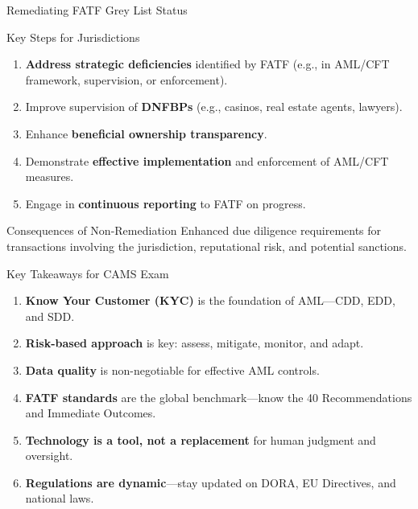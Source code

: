 \documentclass{beamer}
\begin{document}
	\begin{frame}{Remediating FATF Grey List Status}
		\begin{block}{Key Steps for Jurisdictions}
			\begin{enumerate}
				\item \textbf{Address strategic deficiencies} identified by FATF (e.g., in AML/CFT framework, supervision, or enforcement).
				\item Improve supervision of \textbf{DNFBPs} (e.g., casinos, real estate agents, lawyers).
				\item Enhance \textbf{beneficial ownership transparency}.
				\item Demonstrate \textbf{effective implementation} and enforcement of AML/CFT measures.
				\item Engage in \textbf{continuous reporting} to FATF on progress.
			\end{enumerate}
		\end{block}
		\begin{alertblock}{Consequences of Non-Remediation}
			Enhanced due diligence requirements for transactions involving the jurisdiction, reputational risk, and potential sanctions.
		\end{alertblock}
	\end{frame}
	
	\begin{frame}{Key Takeaways for CAMS Exam}
		\begin{enumerate}
			\item \textbf{Know Your Customer (KYC)} is the foundation of AML—CDD, EDD, and SDD.
			\item \textbf{Risk-based approach} is key: assess, mitigate, monitor, and adapt.
			\item \textbf{Data quality} is non-negotiable for effective AML controls.
			\item \textbf{FATF standards} are the global benchmark—know the 40 Recommendations and Immediate Outcomes.
			\item \textbf{Technology is a tool, not a replacement} for human judgment and oversight.
			\item \textbf{Regulations are dynamic}—stay updated on DORA, EU Directives, and national laws.
		\end{enumerate}
	\end{frame}
	
\end{document}
